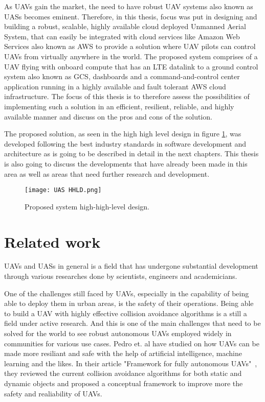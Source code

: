 As UAVs gain the market, the need to have robust UAV systems also known as UASs becomes eminent. Therefore, in this thesis, focus was put in designing and building a robust, scalable, highly available cloud deployed Unmanned Aerial System, that can easily be integrated with cloud services like Amazon Web Services also known as AWS to provide a solution where UAV pilots can control UAVs from virtually anywhere in the world. The proposed system comprises of a UAV flying with onboard compute that has an LTE datalink to a ground control system also known as GCS, dashboards and a command-and-control center application running in a highly available and fault tolerant AWS cloud infrastructure. The focus of this thesis is to therefore assess the possibilities of implementing such a solution in an efficient, resilient, reliable, and highly available manner and discuss on the pros and cons of the solution.

The proposed solution, as seen in the high high level design in figure \ref{fig:uas-hhld}, was developed following the best industry standards in software development and architecture as is going to be described in detail in the next chapters. This thesis is also going to discuss the developments that have already been made in this area as well as areas that need further research and development.

\begin{figure}[!htbp]
    \centering \texttt{[image: UAS HHLD.png]}
    \caption{Proposed system high-high-level design.}
    \label{fig:uas-hhld}
\end{figure}


\section{Related work}
\label{sec:related-work}

UAVs and UASs in general is a field that has undergone substantial development through various researches done by scientists, engineers and academicians.

One of the challenges still faced by UAVs, especially in the capability of being able to deploy them in urban areas, is the safety of their operations. Being able to build a UAV with highly effective collision avoidance algorithms is a still a field under active research. And this is one of the main challenges that need to be solved for the world to see robust autonomous UAVs employed widely in communities for various use cases. Pedro et. al have studied on how UAVs can be made more resiliant and safe with the help of artificial intelligence, machine learning and the likes. In their article "Framework for fully autonomous UAVs"~\cite{Pedro2020}, they reviewed the current collision avoidance algorithms for both static and dynamic objects and proposed a conceptual framework to improve more the safety and realiability of UAVs.

